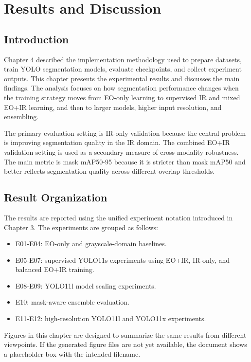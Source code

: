 \chapter{Results and Discussion}

\section{Introduction}

Chapter 4 described the implementation methodology used to prepare datasets, train YOLO segmentation models, evaluate checkpoints, and collect experiment outputs. This chapter presents the experimental results and discusses the main findings. The analysis focuses on how segmentation performance changes when the training strategy moves from EO-only learning to supervised IR and mixed EO+IR learning, and then to larger models, higher input resolution, and ensembling.

The primary evaluation setting is IR-only validation because the central problem is improving segmentation quality in the IR domain. The combined EO+IR validation setting is used as a secondary measure of cross-modality robustness. The main metric is mask mAP50-95 because it is stricter than mask mAP50 and better reflects segmentation quality across different overlap thresholds.

\section{Result Organization}

The results are reported using the unified experiment notation introduced in Chapter 3. The experiments are grouped as follows:

\begin{itemize}
    \item E01-E04: EO-only and grayscale-domain baselines.
    \item E05-E07: supervised YOLO11s experiments using EO+IR, IR-only, and balanced EO+IR training.
    \item E08-E09: YOLO11l model scaling experiments.
    \item E10: mask-aware ensemble evaluation.
    \item E11-E12: high-resolution YOLO11l and YOLO11x experiments.
\end{itemize}

Figures in this chapter are designed to summarize the same results from different viewpoints. If the generated figure files are not yet available, the document shows a placeholder box with the intended filename.

